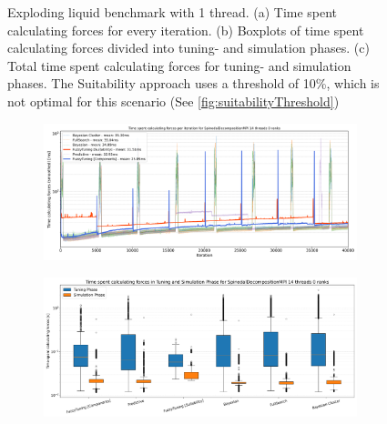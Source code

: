 \begin{figure}[H]
    \caption[Exploding liquid benchmark with 1 thread]{Exploding liquid benchmark with 1 thread. (a) Time spent calculating forces for every iteration. (b) Boxplots of time spent calculating forces divided into tuning- and simulation phases. (c) Total time spent calculating forces for tuning- and simulation phases. The Suitability approach uses a threshold of 10\%, which is not optimal for this scenario (See \autoref{fig:suitabilityThreshold})}
    \label{fig:explodingLiquid_1thread}
\end{figure}

\begin{figure}[H]
    \centering

    \begin{subfigure}[c]{\textwidth}
        \includegraphics[width=\columnwidth,trim={0cm 0 0cm 0.9cm},clip]{figures/Benchmark/SpinodalDecompositionMPI/SpinodalDecompositionMPI_timings_SpinodalDecompositionMPI_14_0.png}
        \caption{}
        \label{fig:spinodalTimings_14thread}
    \end{subfigure}


    \begin{subfigure}[c]{\textwidth}
        \includegraphics[width=\columnwidth,trim={0cm 0 0cm 1cm},clip]{figures/Benchmark/SpinodalDecompositionMPI/SpinodalDecompositionMPI_timings_boxplot_SpinodalDecompositionMPI_14_0.png}
        \caption{}
        \label{fig:spinodalBoxplot_14thread}
    \end{subfigure}


\end{figure}

